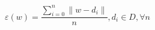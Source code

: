 \begin{equation}
  \label{eq:avg_quant_error}
  \varepsilon(w) = \frac{\sum_{i=0}^{n} \| w - d_{i}  \| }{n}, d_{i} \in D, \forall n
\end{equation} 
